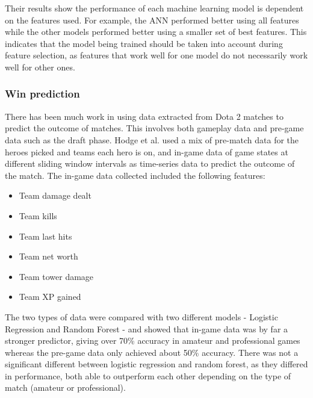 \documentclass[Report.tex]{subfiles}
\begin{document}
Their results show the performance of each machine learning model is dependent on the features used. For example, the ANN performed better using all features while the other models performed better using a smaller set of best features. This indicates that the model being trained should be taken into account during feature selection, as features that work well for one model do not necessarily work well for other ones. 

\subsubsection{Win prediction}
There has been much work in using data extracted from Dota 2 matches to predict the outcome of matches. This involves both gameplay data and pre-game data such as the draft phase. Hodge et al. \cite{dota-mixed-rank-win} used a mix of pre-match data for the heroes picked and teams each hero is on, and in-game data of game states at different sliding window intervals as time-series data to predict the outcome of the match. The in-game data collected included the following features:
\begin{itemize}
\item Team damage dealt
\item Team kills
\item Team last hits
\item Team net worth
\item Team tower damage
\item Team XP gained
\end{itemize}
The two types of data were compared with two different models - Logistic Regression and Random Forest - and showed that in-game data was by far a stronger predictor, giving over 70\% accuracy in amateur and professional games whereas the pre-game data only achieved about 50\% accuracy. There was not a significant different between logistic regression and random forest, as they differed in performance, both able to outperform each other depending on the type of match (amateur or professional). 
\end{document}

